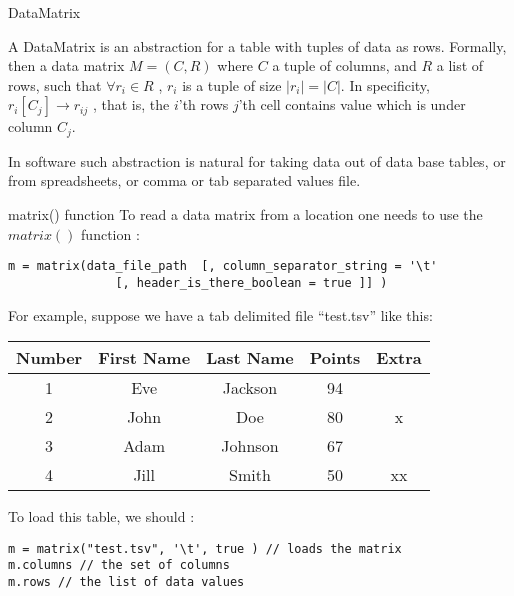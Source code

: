 \begin{section}{DataMatrix}

A DataMatrix is an abstraction for a table with tuples of data as rows.
Formally, then a data matrix $M = (C,R) $ where $C$ a tuple of columns,
and $R$ a list of rows, such that  $\forall r_i \in R$ , $r_i$ is a tuple
of size $|r_i| = |C|$. In specificity, $r_i[C_j] \to r_{ij}$ , that is, 
the $i$'th rows $j$'th cell contains value which is under column $C_j$.

In software such abstraction is natural for taking data out of data base tables, 
or from spreadsheets, or comma or tab separated values file.   

\begin{subsection}{matrix() function}
To read a data matrix from a location one needs to use the $matrix()$ function :

\begin{lstlisting}[style=JexlStyle]
m = matrix(data_file_path  [, column_separator_string = '\t' 
               [, header_is_there_boolean = true ]] )
\end{lstlisting}

For example, suppose we have a tab delimited file ``test.tsv''  like this:

\begin{center}\label{matrix}
\begin{tabular}{ |c|c|c|c|c| } 
 \hline
 Number	& First Name & Last Name & Points & Extra \\ 
 \hline 
   1    & Eve	     & Jackson	& 94      & \\
   2    & John       &  Doe	    & 80      &  x \\ 
   3    & Adam       & Johnson	& 67      &  \\	
   4    & Jill       & Smith	& 50      & xx \\  
 \hline
\end{tabular}
\end{center}

To load this table, we should :
 

\begin{center}\begin{minipage}{\linewidth}
\begin{lstlisting}[style=JexlStyle]
m = matrix("test.tsv", '\t', true ) // loads the matrix 
m.columns // the set of columns 
m.rows // the list of data values
\end{lstlisting}
\end{minipage}\end{center}


\end{subsection}
\end{section}
